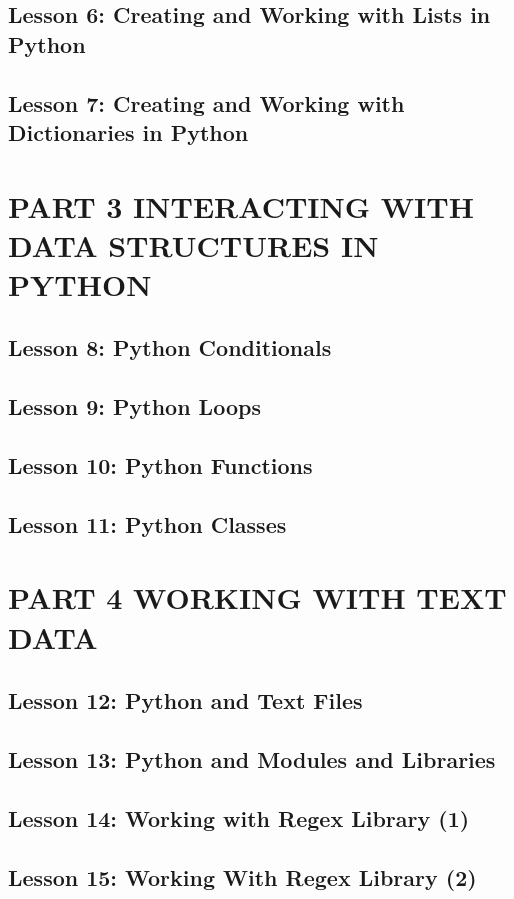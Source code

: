 \documentclass[11pt]{article}
\begin{document}
\subsection{Lesson 6: Creating and Working with Lists in Python}
\label{sec:org1223ae9}
\subsection{Lesson 7: Creating and Working with Dictionaries in Python}
\label{sec:org03e18fb}
\section{PART 3 INTERACTING WITH DATA STRUCTURES IN PYTHON}
\label{sec:org8c6c262}
\subsection{Lesson 8: Python Conditionals}
\label{sec:org4981fa4}
\subsection{Lesson 9: Python Loops}
\label{sec:org5d6b78b}
\subsection{Lesson 10: Python Functions}
\label{sec:org86dc8cc}
\subsection{Lesson 11: Python Classes}
\label{sec:orgfae9d03}
\section{PART 4 WORKING WITH TEXT DATA}
\label{sec:orgccf5aef}
\subsection{Lesson 12: Python and Text Files}
\label{sec:orgeb8c943}
\subsection{Lesson 13: Python and Modules and Libraries}
\label{sec:org626a38e}
\subsection{Lesson 14: Working with Regex Library (1)}
\label{sec:org639f7d0}
\subsection{Lesson 15: Working With Regex Library (2)}
\label{sec:orgec977af}
\end{document}
